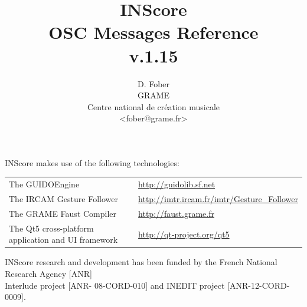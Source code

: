 \documentclass[a4paper,twoside]{report}
\begin{document}
\title{INScore \\ OSC Messages Reference \\v.1.15}

\author{D. Fober\\ GRAME\\ Centre national de cr\'eation musicale\\
{\small <fober@grame.fr>} \\
}

\maketitle

\vspace*{17.5cm}
 
{\small INScore makes use of the following technologies:}
\begin{table}[h]
\begin{tabular}{ll}
{\small The GUIDOEngine}  					& {\small \url{http://guidolib.sf.net}} \\
{\small The IRCAM Gesture Follower} 		& {\small \url{http://imtr.ircam.fr/imtr/Gesture_Follower}} \\
{\small The GRAME Faust Compiler} 		& {\small \url{http://faust.grame.fr}} \\
{\small The Qt5 cross-platform application and UI framework} & {\small \url{http://qt-project.org/qt5}}
\end{tabular}
\end{table}%

{\small INScore research and development has been funded by the French National Research Agency [ANR]\\ Interlude project [ANR- 08-CORD-010] and INEDIT project [ANR-12-CORD-0009].}
  

\pagestyle{empty}
\cleardoublepage
\tableofcontents

\vspace*{18.5cm}

\noindent\hrulefill\par
\vspace*{2mm}
\noindent{}
\thispagestyle{empty}
\pagestyle{plain}
\end{document}

